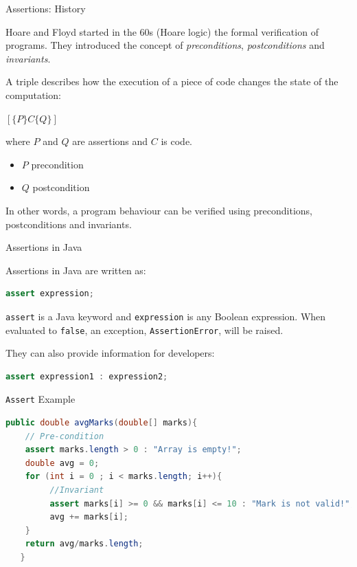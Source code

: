 \documentclass[11pt, xcolor=svgnames]{beamer}
\begin{document}

\begin{frame}{Assertions: History}


Hoare and Floyd started in the 60s (Hoare logic) the formal verification of programs. They introduced the concept of \emph{preconditions}, \emph{postconditions} and \emph{invariants}.

A triple describes how the execution of a piece of code changes the state of the computation:

  $[\{P\}C\{Q\}]$

\noindent where $P$ and $Q$ are assertions and $C$ is code.

\begin{itemize}
	\item $P$ precondition 
	\item $Q$ postcondition
\end{itemize}

In other words, a program behaviour can be verified using preconditions, postconditions and invariants.


\end{frame}


\begin{frame}[fragile]{Assertions in Java}

  Assertions in Java are written as:

  \begin{lstlisting}[language=JAVA,basicstyle=\small]
  assert expression;
  \end{lstlisting}
  
  \texttt{assert} is a Java keyword and \texttt{expression} is any Boolean expression. When evaluated to \texttt{false}, an exception, \texttt{AssertionError}, will be raised. 
  
  They can also provide information for developers:
  
  \begin{lstlisting}[language=JAVA,basicstyle=\small]
  assert expression1 : expression2;
  \end{lstlisting}

\end{frame}


\begin{frame}[fragile]{\texttt{Assert} Example}

\begin{lstlisting}[language=JAVA,basicstyle=\scriptsize]
  public double avgMarks(double[] marks){
 	// Pre-condition
	assert marks.length > 0 : "Array is empty!";
   	double avg = 0;
   	for (int i = 0 ; i < marks.length; i++){
	     //Invariant	
   	     assert marks[i] >= 0 && marks[i] <= 10 : "Mark is not valid!";
   	     avg += marks[i];
   	}
   	return avg/marks.length;
   }
\end{lstlisting}

\end{frame}
\end{document}
